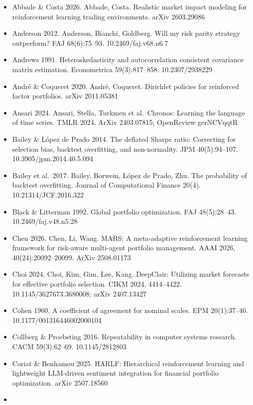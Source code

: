\documentclass[12pt,a4paper]{report}
\providecommand{\tightlist}{\setlength{\itemsep}{0pt}\setlength{\parskip}{0pt}}
\begin{document}
\begin{itemize}
\tightlist
\item
  Abbade \& Costa 2026. Abbade, Costa. Realistic market impact modeling
  for reinforcement learning trading environments. arXiv 2603.29086
\item
  Anderson 2012. Anderson, Bianchi, Goldberg. Will my risk parity
  strategy outperform? FAJ 68(6):75--93. 10.2469/faj.v68.n6.7
\item
  Andrews 1991. Heteroskedasticity and autocorrelation consistent
  covariance matrix estimation. Econometrica 59(3):817--858.
  10.2307/2938229
\item
  André \& Coqueret 2020. André, Coqueret. Dirichlet policies for
  reinforced factor portfolios. arXiv 2011.05381
\item
  Ansari 2024. Ansari, Stella, Turkmen et al.~Chronos: Learning the
  language of time series. TMLR 2024. ArXiv 2403.07815; OpenReview
  gerNCVqqtR
\item
  Bailey \& López de Prado 2014. The deflated Sharpe ratio: Correcting
  for selection bias, backtest overfitting, and non-normality. JPM
  40(5):94--107. 10.3905/jpm.2014.40.5.094
\item
  Bailey et al.~2017. Bailey, Borwein, López de Prado, Zhu. The
  probability of backtest overfitting. Journal of Computational Finance
  20(4). 10.21314/JCF.2016.322
\item
  Black \& Litterman 1992. Global portfolio optimization. FAJ
  48(5):28--43. 10.2469/faj.v48.n5.28
\item
  Chen 2026. Chen, Li, Wang. MARS: A meta-adaptive reinforcement
  learning framework for risk-aware multi-agent portfolio management.
  AAAI 2026, 40(24):20092--20099. ArXiv 2508.01173
\item
  Choi 2024. Choi, Kim, Gim, Lee, Kang. DeepClair: Utilizing market
  forecasts for effective portfolio selection. CIKM 2024, 4414--4422.
  10.1145/3627673.3680008; arXiv 2407.13427
\item
  Cohen 1960. A coefficient of agreement for nominal scales. EPM
  20(1):37--46. 10.1177/001316446002000104
\item
  Collberg \& Proebsting 2016. Repeatability in computer systems
  research. CACM 59(3):62--69. 10.1145/2812803
\item
  Coriat \& Benhamou 2025. HARLF: Hierarchical reinforcement learning
  and lightweight LLM-driven sentiment integration for financial
  portfolio optimization. arXiv 2507.18560
\item

\end{itemize}
\end{document}
